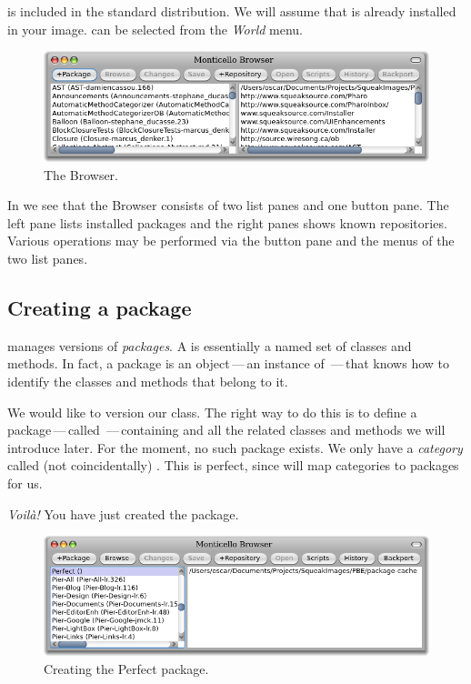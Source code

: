 \documentclass[a4paper,10pt,twoside]{book}
\begin{document}
\MC is included in the standard \pharo distribution.
We will assume that \MC is already installed in your image.
 can be selected from the \emph{World} menu.

\begin{figure}[ht]\centering
	\includegraphics[width=\textwidth]{monticelloBrowser}
	\caption{The \MC Browser.}
\end{figure}

In  we see that the \MC Browser consists of two list panes and one button pane. The left pane lists installed packages and the right panes shows known repositories.
Various operations may be performed via the button pane and the menus of the two list panes.

\subsection{Creating a package}

\MC manages versions of \emph{packages}.  A  is essentially a named set of classes and methods.
In fact, a package is an object\,---\,an instance of \,---\,that knows how to identify the classes and methods that belong to it.

We would like to version our  class. The right way to do this is to define a package\,---\,called \,---\,containing  and all the related classes and methods we will introduce later. For the moment, no such package exists. We only have a \emph{category} called (not coincidentally) . This is perfect, %
since \MC will map categories to packages for us.


\emph{Voil\`a!} You have just created the  \MC package. 

\begin{figure}[ht]\centering
	\includegraphics[width=\textwidth]{perfectPackage}
	\caption{Creating the Perfect package.}
\end{figure}
\end{document}
